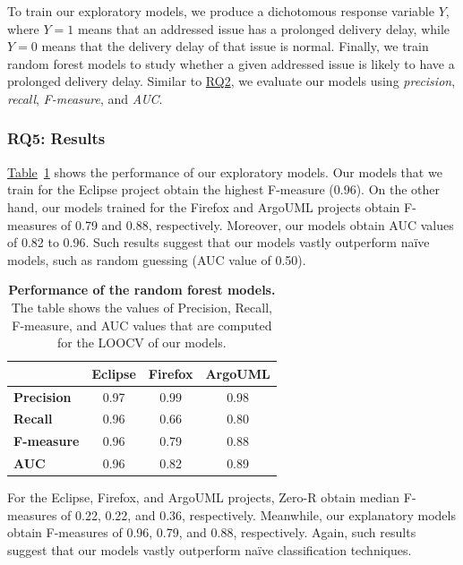 To train our exploratory models, we produce a dichotomous response variable $Y$,
where $Y=1$ means that an addressed issue has a prolonged delivery delay, while $Y=0$
means that the delivery delay of that issue is normal. Finally, we train
random forest models to study whether a given addressed issue is likely to have a
prolonged delivery delay. Similar to \hyperref[ch4:rq2]{RQ2}, we evaluate our models
using \textit{precision}, \textit{recall}, \textit{F-measure}, and \textit{AUC}.

\subsubsection*{RQ5: Results}

\noindent{}
\hyperref[ch4:tbl:RFclassificationResult_ab]{Table}~\ref{ch4:tbl:RFclassificationResult_ab}
shows the performance of our exploratory models. Our models that we train for
the Eclipse project obtain the highest F-measure (0.96). On the other hand, our
models trained for the Firefox and ArgoUML projects obtain F-measures of 0.79
and 0.88, respectively. Moreover, our models obtain AUC values of 0.82 to 0.96.
Such results suggest that our models vastly outperform na\"{i}ve models, such as
random guessing (AUC value of 0.50).  \\

\begin{table}[t!]
	\footnotesize
	\centering
	\caption{\textbf{Performance of the random forest models.} The table
		shows the values of Precision, Recall, F-measure, and AUC values that
	are computed for the LOOCV of our models.}
	\label{ch4:tbl:RFclassificationResult_ab}
	\begin{tabular}{lccc}
		\cline{2-4} 
		& \textbf{Eclipse} & \textbf{Firefox} & \textbf{ArgoUML}\tabularnewline
		\hline 
		\textbf{Precision} & 0.97 & 0.99 & 0.98\tabularnewline
		\hline 
		\textbf{Recall} & 0.96 & 0.66 & 0.80\tabularnewline
		\hline 
		\textbf{F-measure} & 0.96 & 0.79 & 0.88\tabularnewline
		\hline 
		\textbf{AUC} & 0.96 & 0.82 & 0.89\tabularnewline
		\hline 
	\end{tabular}
\end{table}

\noindent{} For the Eclipse, Firefox, and ArgoUML projects, Zero-R obtain median F-measures
of 0.22, 0.22, and 0.36, respectively. Meanwhile, our explanatory models obtain
F-measures of 0.96, 0.79, and 0.88, respectively. Again, such results suggest
that our models vastly outperform na\"{i}ve classification techniques.  \\

